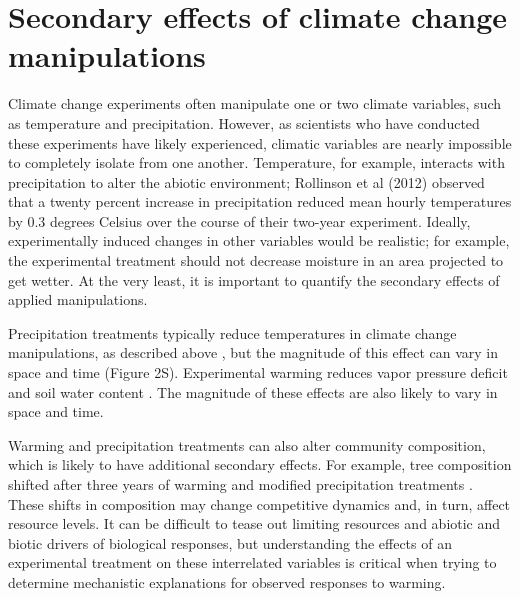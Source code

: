 \documentclass{article}
\begin{document}
\section* {Secondary effects of climate change manipulations}
Climate change experiments often manipulate one or two climate variables, such as temperature and precipitation. However, as scientists who have conducted these experiments have likely experienced, climatic variables are nearly impossible to completely isolate from one another.  Temperature, for example, interacts with precipitation to alter the abiotic environment; Rollinson et al (2012) observed that a twenty percent increase in precipitation reduced mean hourly temperatures by 0.3 degrees Celsius over the course of their two-year experiment. Ideally, experimentally induced changes in other variables would be realistic; for example, the experimental treatment should not decrease moisture in an area projected to get wetter. At the very least, it is important to quantify the secondary effects of applied manipulations.  
\par Precipitation treatments typically reduce temperatures in climate change manipulations, as described above \citep[e.g.][]{sherry2007,rollinson2012}, but the magnitude of this effect can vary in space and time (Figure 2S). Experimental warming  reduces vapor pressure deficit and soil water content \citep[e.g. Figure 3S][]{sherry2007,morin2010,templer2016}. The magnitude of these effects are also likely to vary in space and time. 
\par Warming and precipitation treatments can also alter community composition, which is likely to have additional secondary effects. For example, tree composition shifted after three years of warming and modified precipitation treatments \citep{rollinson2012}. These shifts in composition may change competitive dynamics and, in turn, affect resource levels.  It can be difficult to tease out limiting resources and abiotic and biotic drivers of biological responses, but understanding the effects of an experimental treatment on these interrelated variables is critical when trying to determine mechanistic explanations for observed responses to warming.
\end{document}
